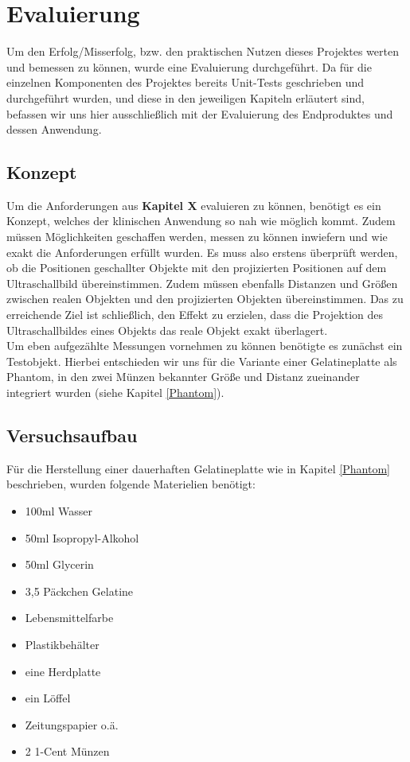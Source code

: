 \chapter{Evaluierung}
Um den Erfolg/Misserfolg, bzw. den praktischen Nutzen dieses Projektes werten und bemessen zu können, wurde eine Evaluierung durchgeführt. Da für die einzelnen Komponenten des Projektes bereits Unit-Tests geschrieben und durchgeführt wurden, und diese in den jeweiligen Kapiteln erläutert sind, befassen wir uns hier ausschließlich mit der Evaluierung des Endproduktes und dessen Anwendung.
\section{Konzept}
Um die Anforderungen aus \textbf{Kapitel X} evaluieren zu können, benötigt es ein Konzept, welches der klinischen Anwendung so nah wie möglich kommt. Zudem müssen Möglichkeiten geschaffen werden, messen zu können inwiefern und wie exakt die Anforderungen erfüllt wurden. Es muss also erstens überprüft werden, ob die Positionen geschallter Objekte mit den projizierten Positionen auf dem Ultraschallbild übereinstimmen. Zudem müssen ebenfalls Distanzen und Größen zwischen realen Objekten und den projizierten Objekten übereinstimmen. Das zu erreichende Ziel ist schließlich, den Effekt zu erzielen, dass die Projektion des Ultraschallbildes eines Objekts das reale Objekt exakt überlagert. 
\\
Um eben aufgezählte Messungen vornehmen zu können benötigte es zunächst ein Testobjekt. Hierbei entschieden wir uns für die Variante einer Gelatineplatte als Phantom, in den zwei Münzen bekannter Größe und Distanz zueinander integriert wurden (siehe Kapitel \ref{Phantom}). 
\clearpage
\section{Versuchsaufbau} \label{Versuchsaufbau}
Für die Herstellung einer dauerhaften Gelatineplatte wie in Kapitel \ref{Phantom} beschrieben, wurden folgende Materielien benötigt:
\begin{itemize}
\item 100ml Wasser
\item 50ml Isopropyl-Alkohol
\item 50ml Glycerin
\item 3,5 Päckchen Gelatine
\item Lebensmittelfarbe
\item Plastikbehälter
\item eine Herdplatte
\item ein Löffel
\item Zeitungspapier o.ä.
\item 2 1-Cent Münzen
\end{itemize}

